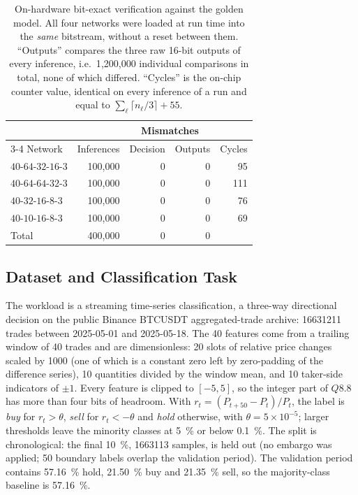 \documentclass[pdflatex,sn-mathphys-num,iicol]{sn-jnl}
\begin{document}
\begin{table}[htbp]
\centering
\caption{On-hardware bit-exact verification against the golden model. All four
networks were loaded at run time into the \emph{same} bitstream, without a
reset between them. ``Outputs'' compares the three raw 16-bit outputs of every
inference, i.e.\ 1{,}200{,}000 individual comparisons in total, none of which
differed. ``Cycles'' is the on-chip counter value, identical on every inference
of a run and equal to $\sum_\ell \lceil n_\ell/3\rceil + 55$.}
\label{tab:verification}
\small
\begin{tabular*}{\columnwidth}{@{\extracolsep{\fill}}lrrrr@{}}
\toprule
 & & \multicolumn{2}{c}{Mismatches} & \\
\cmidrule(lr){3-4}
Network & Inferences & Decision & Outputs & Cycles \\
\midrule
$40$-$64$-$32$-$16$-$3$ & 100{,}000 & 0 & 0 & 95 \\
$40$-$64$-$64$-$32$-$3$ & 100{,}000 & 0 & 0 & 111 \\
$40$-$32$-$16$-$8$-$3$  & 100{,}000 & 0 & 0 & 76 \\
$40$-$10$-$16$-$8$-$3$  & 100{,}000 & 0 & 0 & 69 \\
\midrule
Total                   & 400{,}000 & 0 & 0 & \\
\bottomrule
\end{tabular*}
\end{table}

\subsection{Dataset and Classification Task}
\label{sec:dataset}
The workload is a streaming time-series classification, a three-way
directional decision on the public Binance BTCUSDT aggregated-trade archive:
\num{16631211} trades between 2025-05-01 and 2025-05-18. The 40 features come from a trailing window of 40 trades and are
dimensionless: 20 slots of relative price changes scaled by \num{1000} (one of
which is a constant zero left by zero-padding of the difference series), 10
quantities divided by the window mean, and 10 taker-side indicators of $\pm 1$.
Every feature is clipped to $[-5,5]$, so the integer part of $Q8.8$ has more
than four bits of headroom. With $r_t = (P_{t+50}-P_t)/P_t$, the label is
\emph{buy} for $r_t > \theta$, \emph{sell} for $r_t < -\theta$ and \emph{hold}
otherwise, with $\theta = 5\times10^{-5}$; larger thresholds leave the minority
classes at \SI{5}{\percent} or below \SI{0.1}{\percent}. The split is
chronological: the final \SI{10}{\percent}, \num{1663113} samples, is held out
(no embargo was applied; 50 boundary labels overlap the validation period). The
validation period contains \SI{57.16}{\percent} hold, \SI{21.50}{\percent} buy
and \SI{21.35}{\percent} sell, so the majority-class baseline is
\SI{57.16}{\percent}.
\end{document}
